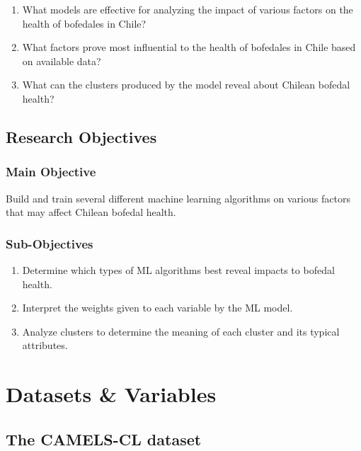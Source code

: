 \documentclass[
  letterpaper,
  DIV=11,
  numbers=noendperiod]{scrreprt}
\providecommand{\tightlist}{%
  \setlength{\itemsep}{0pt}\setlength{\parskip}{0pt}}
\begin{document}
\begin{enumerate}
\def\labelenumi{\arabic{enumi}.}
\tightlist
\item
  What models are effective for analyzing the impact of various factors
  on the health of bofedales in Chile?
\item
  What factors prove most influential to the health of bofedales in
  Chile based on available data?
\item
  What can the clusters produced by the model reveal about Chilean
  bofedal health?
\end{enumerate}

\section{Research Objectives}\label{research-objectives}

\subsection{Main Objective}\label{main-objective}

Build and train several different machine learning algorithms on various
factors that may affect Chilean bofedal health.

\subsection{Sub-Objectives}\label{sub-objectives}

\begin{enumerate}
\def\labelenumi{\arabic{enumi}.}
\tightlist
\item
  Determine which types of ML algorithms best reveal impacts to bofedal
  health.
\item
  Interpret the weights given to each variable by the ML model.
\item
  Analyze clusters to determine the meaning of each cluster and its
  typical attributes.
\end{enumerate}


\chapter{Datasets \& Variables}\label{datasets-variables}

\section{The CAMELS-CL dataset}\label{the-camels-cl-dataset}
\end{document}
